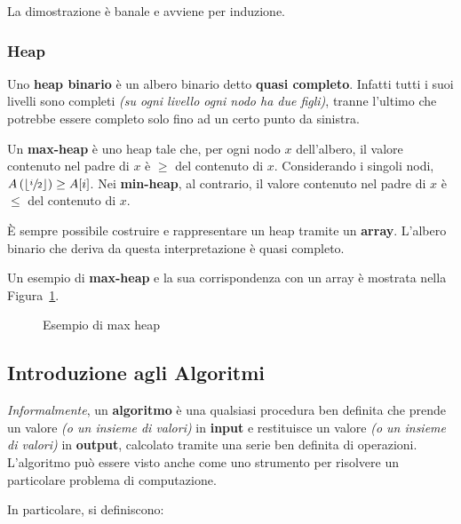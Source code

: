 \documentclass[italian, 10pt]{article}
\begin{document}
La dimostrazione è banale e avviene per induzione.

\subsubsection{Heap}
\label{sec:heap}

Uno \textbf{heap binario} è un albero binario detto \textbf{quasi completo}.
Infatti tutti i suoi livelli sono completi \textit{(su ogni livello ogni nodo ha due figli)}, tranne l'ultimo che potrebbe essere completo solo fino ad un certo punto da sinistra.

Un \textbf{max-heap} è uno heap tale che, per ogni nodo \(x\) dell'albero, il valore contenuto nel padre di \(x\) è \(\geq\) del contenuto di \(x\).
Considerando i singoli nodi, \(A\left(\left\lfloor\sfrac{i}{2}\right\rfloor\right) \geq A[i]\).
Nei \textbf{min-heap}, al contrario, il valore contenuto nel padre di \(x\) è \(\leq\) del contenuto di \(x\).

\bigskip
È sempre possibile costruire e rappresentare un heap tramite un \textbf{array}.
L'albero binario che deriva da questa interpretazione è quasi completo.

\bigskip
Un esempio di \textbf{max-heap} e la sua corrispondenza con un array è mostrata nella Figura~\ref{fig:esempio-di-max-heap}.

\begin{figure}[htbp]
  \bigskip
  \centering
  \caption{Esempio di max heap}
  \label{fig:esempio-di-max-heap}
  \bigskip
\end{figure}

\subsection{Introduzione agli Algoritmi}

\textit{Informalmente}, un \textbf{algoritmo} è una qualsiasi procedura ben definita che prende un valore \textit{(o un insieme di valori)} in \textbf{input} e restituisce un valore \textit{(o un insieme di valori)} in \textbf{output}, calcolato tramite una serie ben definita di operazioni.
L'algoritmo può essere visto anche come uno strumento per risolvere un particolare problema di computazione.

In particolare, si definiscono:
\end{document}
